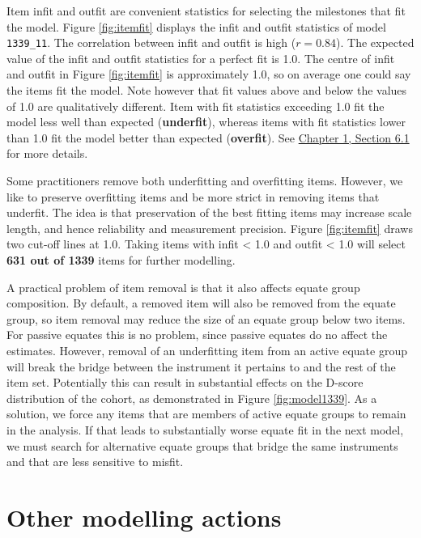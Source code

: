 \documentclass[
]{book}
\begin{document}
Item infit and outfit are convenient statistics for selecting the milestones that fit the model. Figure \ref{fig:itemfit} displays the infit and outfit statistics of model \texttt{1339\_11}. The correlation between infit and outfit is high (\(r = 0.84\)). The expected value of the infit and outfit statistics for a perfect fit is 1.0. The centre of infit and outfit in Figure \ref{fig:itemfit} is approximately 1.0, so on average one could say the items fit the model. Note however that fit values above and below the values of 1.0 are qualitatively different. Item with fit statistics exceeding 1.0 fit the model less well than expected (\textbf{underfit}), whereas items with fit statistics lower than 1.0 fit the model better than expected (\textbf{overfit}). See \href{https://d-score.org/dbook1/sec-itemfit.html}{Chapter 1, Section 6.1} for more details.

Some practitioners remove both underfitting and overfitting items. However, we like to preserve overfitting items and be more strict in removing items that underfit. The idea is that preservation of the best fitting items may increase scale length, and hence reliability and measurement precision. Figure \ref{fig:itemfit} draws two cut-off lines at 1.0. Taking items with infit \textless{} 1.0 and outfit \textless{} 1.0 will select \textbf{631 out of 1339} items for further modelling.

A practical problem of item removal is that it also affects equate group composition. By default, a removed item will also be removed from the equate group, so item removal may reduce the size of an equate group below two items. For passive equates this is no problem, since passive equates do no affect the estimates. However, removal of an underfitting item from an active equate group will break the bridge between the instrument it pertains to and the rest of the item set. Potentially this can result in substantial effects on the D-score distribution of the cohort, as demonstrated in Figure \ref{fig:model1339}. As a solution, we force any items that are members of active equate groups to remain in the analysis. If that leads to substantially worse equate fit in the next model, we must search for alternative equate groups that bridge the same instruments and that are less sensitive to misfit.

\hypertarget{sec:othermodelling}{%
\section{Other modelling actions}\label{sec:othermodelling}}
\end{document}
